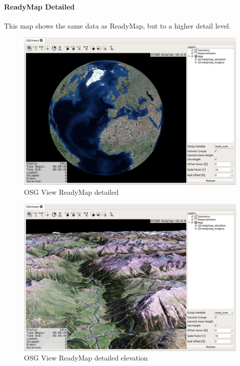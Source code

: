 {\paragraph{ReadyMap Detailed}

This map shows the same data as ReadyMap, but to a higher detail level.

\begin{figure}[H]
    \hspace*{-2cm}
    \includegraphics[width=18cm,frame]{../screenshots/osgview_ready.png}
  \caption{OSG View ReadyMap detailed}
\end{figure}

\begin{figure}[H]
    \hspace*{-2cm}
    \includegraphics[width=18cm]{../screenshots/osgview_readymap_elav.png}
  \caption{OSG View ReadyMap detailed elevation}
\end{figure}

}
